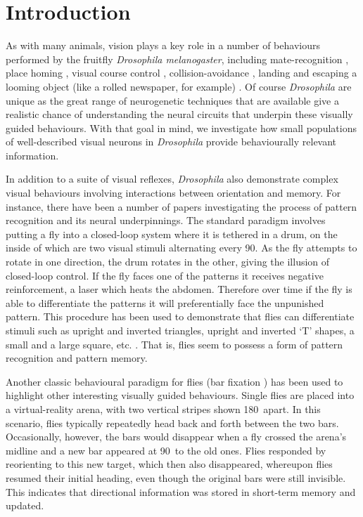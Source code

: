 \section*{Introduction}
As with many animals, vision plays a key role in a number of behaviours performed by the fruitfly \emph{Drosophila melanogaster}, including mate-recognition \cite{Agrawal2014}, place homing \cite{Ofstad2011}, visual course control \cite{Borst2014}, collision-avoidance \cite{Tammero2002}, landing \cite{Tammero2002} and escaping a looming object (like a rolled newspaper, for example) \cite{Card2008}.
Of course \emph{Drosophila} are unique as the great range of neurogenetic techniques that are available give a realistic chance of understanding the neural circuits that underpin these visually guided behaviours. With that goal in mind, we investigate how small populations of well-described visual neurons in \emph{Drosophila} provide behaviourally relevant information.

In addition to a suite of visual reflexes, \emph{Drosophila} also demonstrate complex visual behaviours involving interactions between orientation and memory.
For instance, there have been a number of papers investigating the process of pattern recognition and its neural underpinnings\cite{Pan2009,Liu2006,Ernst1999}.
The standard paradigm involves putting a fly into a closed-loop system where it is tethered in a drum, on the inside of which are two visual stimuli alternating every 90\degree. As the fly attempts to rotate in one direction, the drum rotates in the other, giving the illusion of closed-loop control. If the fly faces one of the patterns it receives negative reinforcement, a laser which heats the abdomen. Therefore over time if the fly is able to differentiate the patterns it will preferentially face the unpunished pattern. This procedure has been used to demonstrate that flies can differentiate stimuli such as upright and inverted triangles, upright and inverted `T' shapes, a small and a large square, etc. \cite{Ernst1999}. That is, flies seem to possess a form of pattern recognition and pattern memory.

Another classic behavioural paradigm for flies (bar fixation \cite{Neuser2008}) has been used to highlight other interesting visually guided behaviours.
Single flies are placed into a virtual-reality arena, with two vertical stripes shown 180\degree\ apart.
In this scenario, flies typically repeatedly head back and forth between the two bars.
Occasionally, however, the bars would disappear when a fly crossed the arena's midline and a new bar appeared at 90\degree\ to the old ones.
Flies responded by reorienting to this new target, which then also disappeared, whereupon flies resumed their initial heading, even though the original bars were still invisible. This indicates that directional information was stored in short-term memory and updated.

